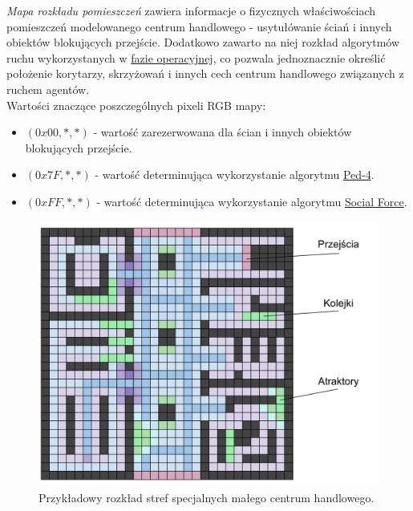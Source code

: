 \documentclass[a4paper, 12pt]{article}
\begin{document}
        \emph{Mapa rozkładu pomieszczeń} zawiera informacje o fizycznych właściwościach pomieszczeń modelowanego centrum handlowego - usytułówanie ściań i innych obiektów blokujących przejście. Dodatkowo zawarto na niej rozkład algorytmów ruchu wykorzystanych w \hyperref[sec:operational]{fazie operacyjnej}, co pozwala jednoznacznie określić położenie korytarzy, skrzyżowań i innych cech centrum handlowego związanych z ruchem agentów. \\

\noindent
Wartości znaczące poszczególnych pixeli RGB mapy:

        \begin{itemize}
            \item $(0x00, *, *)$ - wartość zarezerwowana dla ścian i innych obiektów blokujących przejście.
            \item $(0x7F, *, *)$ - wartość determinująca wykorzystanie algorytmu \hyperref[sec:ped-4-impl]{Ped-4}.
            \item $(0xFF, *, *)$ - wartość determinująca wykorzystanie algorytmu \hyperref[sec:social-force-impl]{Social Force}.
        \end{itemize}

        \begin{figure}[H]
            \centering
            \includegraphics[scale=0.3]{./img/MallFeatures.pdf}
            \caption{Przykładowy rozkład stref specjalnych małego centrum handlowego.}
            \label{fig:mall-features}
        \end{figure}
\end{document}
